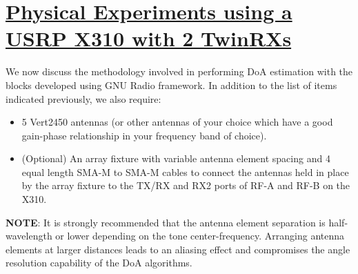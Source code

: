 \documentclass[a4paper, 11pt]{article}
\begin{document}
\section*{\underline{Physical Experiments using a USRP X310 with 2 TwinRXs}}
We now discuss the methodology involved in performing DoA estimation with the blocks developed using GNU Radio framework. In addition to the list of items indicated previously, we also require:
\begin{itemize}
\item 5 Vert2450 antennas (or other antennas of your choice which have a good gain-phase relationship in your frequency band of choice). 
\item (Optional) An array fixture with variable antenna element spacing and 4 equal length SMA-M to SMA-M cables to connect the antennas held in place by the array fixture to the TX/RX and RX2 ports of RF-A and RF-B on the X310.
\end{itemize}
\textbf{NOTE}: It is strongly recommended that the antenna element separation is half-wavelength or lower depending on the tone center-frequency. Arranging antenna elements at larger distances leads to an aliasing effect and compromises the angle resolution capability of the DoA algorithms. 
\end{document}
